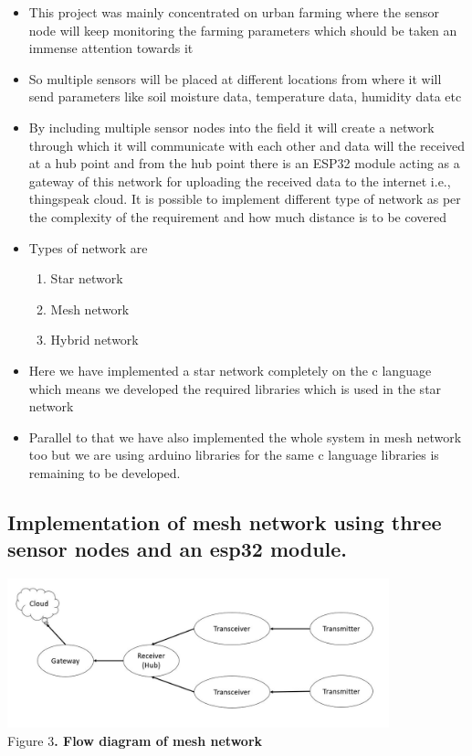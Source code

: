 \documentclass[a4paper,12pt,oneside]{book}
\begin{document}
\label{Figure 3. Flow chart}
\begin{itemize}
\item This project was mainly concentrated on urban farming where the sensor node will keep monitoring the farming parameters which should be taken an immense attention towards it
\item  So  multiple sensors will be placed at different locations from where it will send parameters like soil moisture data, temperature data, humidity data etc
\item  By including multiple sensor nodes into the field it will create a network through which it will communicate with each other and data will the received at a hub point and from the hub point there is an ESP32 module acting as a gateway of this network for uploading the received data to the internet i.e., thingspeak cloud. It is possible to implement different type of network as per the complexity of the requirement and how much distance is to be covered
\item Types of network are
\begin{enumerate}
\item  Star network
\item Mesh network
\item Hybrid network
\end{enumerate}
\item  Here we have implemented a star network completely on the c language which means we developed the required libraries which is used in the star network
\item Parallel to that we have also implemented the whole system in mesh network too but we are using arduino libraries for the same c language libraries is remaining to be developed.
\end{itemize}

\subsection*{\textbf{Implementation of mesh network using three  sensor nodes and an esp32 module.}}

  \begin{center}
     \includegraphics[width=0.83\textwidth]{mesh_diagram.JPG}\\
         \small{Figure 3\textbf{. Flow diagram of mesh network}}
   \end{center}
         
\end{document}
